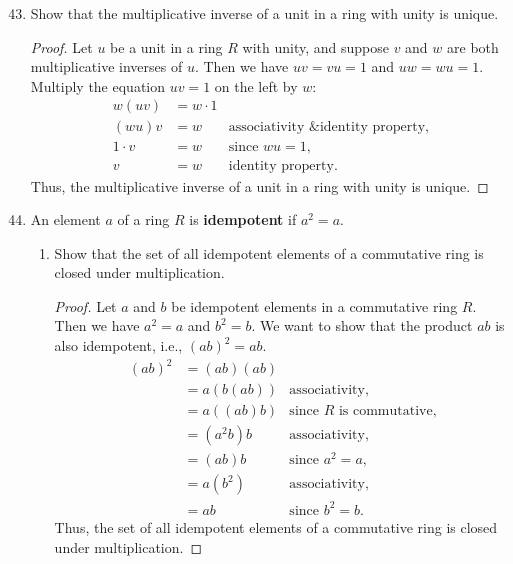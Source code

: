 \documentclass[12pt, oneside]{book}
\newcommand{\pf}[1]{
    \begin{customframedproof}[linecolor=orangehdx!75]
        \begin{proof}
        #1
        \end{proof}
    \end{customframedproof}
}
\begin{document}
\begin{enumerate}
    \setcounter{enumi}{42}
    \item Show that the multiplicative inverse of a unit in a ring with unity is unique.
    \pf{
        Let \(u\) be a unit in a ring \(R\) with unity, and suppose \(v\) and \(w\) are both multiplicative inverses of \(u\). Then we have \(uv =vu = 1\) and \(uw = wu = 1\). Multiply the equation \(uv = 1\) on the left by \(w\):
        \begin{align*}
            w(uv) &= w \cdot 1 \\
            (wu)v &= w & \text{associativity \& identity property,}\\
            1 \cdot v &= w & \text{since } wu = 1, \\
            v &= w & \text{identity property.}
        \end{align*}
        Thus, the multiplicative inverse of a unit in a ring with unity is unique.
    }
    \item An element \(a\) of a ring \(R\) is \textbf{idempotent} if \(a^{2} = a\).
    \begin{enumerate}[label=\textbf{\alph*.}]
        \item Show that the set of all idempotent elements of a commutative ring is closed under multiplication.
        \pf{
            Let \(a\) and \(b\) be idempotent elements in a commutative ring \(R\). Then we have \(a^{2} = a\) and \(b^{2} = b\). We want to show that the product \(ab\) is also idempotent, i.e., \((ab)^{2} = ab\).
            \begin{align*}
                (ab)^{2} &= (ab)(ab) \\
                &= a(b(ab)) & \text{associativity,}\\
                &= a((ab)b) & \text{since } R \text{ is commutative,}\\
                &= (a^{2}b)b & \text{associativity,}\\
                &= (ab)b & \text{since } a^{2} = a,\\
                &= a(b^{2}) & \text{associativity,}\\
                &= ab & \text{since } b^{2} = b.
            \end{align*}
            Thus, the set of all idempotent elements of a commutative ring is closed under multiplication.
        }


\end{enumerate}
\end{enumerate}
\end{document}
